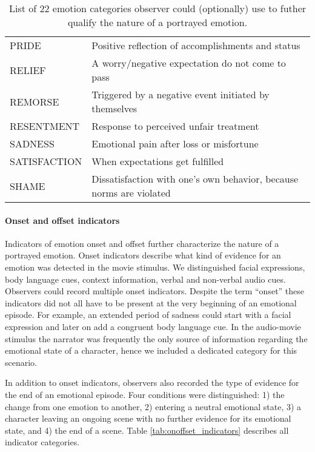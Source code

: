 \begin{table}
\begin{tabular}{lp{10cm}}
    PRIDE & Positive reflection of accomplishments and status \\
    RELIEF & A worry/negative expectation do not come to pass \\
    REMORSE & Triggered by a negative event initiated by themselves \\
    RESENTMENT & Response to perceived unfair treatment \\
    SADNESS & Emotional pain after loss or misfortune \\
    SATISFACTION & When expectations get fulfilled \\
    SHAME & Dissatisfaction with one's own behavior, because norms are violated \\
  \end{tabular}
  \caption{List of 22 emotion categories observer could (optionally) use to
  futher qualify the nature of a portrayed emotion.}
  \label{tab:emotion_categories}
\end{table}


\paragraph{Onset and offset indicators}

Indicators of emotion onset and offset further characterize the nature of a
portrayed emotion. Onset indicators describe what kind of evidence for an
emotion was detected in the movie stimulus. We distinguished facial
expressions, body language cues, context information, verbal and non-verbal
audio cues. Observers could record multiple onset indicators. Despite the term
``onset'' these indicators did not all have to be present at the very beginning
of an emotional episode. For example, an extended period of sadness could start
with a facial expression and later on add a congruent body language cue.  In
the audio-movie stimulus the narrator was frequently the only source of
information regarding the emotional state of a character, hence we included a
dedicated category for this scenario.

In addition to onset indicators, observers also recorded the type of evidence
for the end of an emotional episode. Four conditions were distinguished: 1) the
change from one emotion to another, 2) entering a neutral emotional state, 3) a
character leaving an ongoing scene with no further evidence for its emotional
state, and 4) the end of a scene.  Table \ref{tab:onoffset_indicators}
describes all indicator categories.

